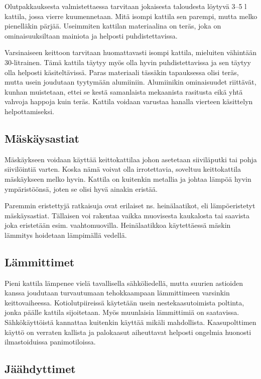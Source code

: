 \documentclass[a4paper,11pt]{report}
\begin{document}
Olutpakkauksesta valmistettaessa tarvitaan jokaisesta taloudesta löytyvä 3--5 l kattila, jossa vierre kuumennetaan. Mitä isompi kattila sen parempi, mutta melko pienelläkin pärjää. Useimmiten kattilan materiaalina on teräs, joka on ominaisuuksiltaan mainiota ja helposti puhdistettavissa.

Varsinaiseen keittoon tarvitaan huomattavasti isompi kattila, mieluiten vähintään 30-litrainen. Tämä kattila täytyy myös olla hyvin puhdistettavissa ja sen täytyy olla helposti käsiteltävissä. Paras materiaali tässäkin tapauksessa olisi teräs, mutta usein joudutaan tyytymään alumiiniin. Alumiinikin ominaisuudet riittävät, kunhan muistetaan, ettei se kestä samanlaista mekaanista rasitusta eikä yhtä vahvoja happoja kuin teräs. Kattila voidaan varustaa hanalla vierteen käsittelyn helpottamiseksi.

\subsection*{Mäskäysastiat}

Mäskäykseen voidaan käyttää keittokattilaa johon asetetaan siiviläputki tai pohja siivilöintiä varten. Koska nämä voivat olla irrotettavia, soveltuu keittokattila mäskäykseen melko hyvin. Kattila on kuitenkin metallia ja johtaa lämpöä hyvin ympäristöönsä, joten se olisi hyvä ainakin eristää.

Paremmin eristettyjä ratkaisuja ovat erilaiset ns. heinälaatikot, eli lämpöeristetyt mäskäysastiat. Tällaisen voi rakentaa vaikka muovisesta kaukalosta tai saavista joka eristetään esim. vaahtomuovilla. Heinälaatikkoa käytettäessä mäskin lämmitys hoidetaan lämpimällä vedellä.

\subsection*{Lämmittimet}
Pieni kattila lämpenee vielä tavallisella sähköliedellä, mutta suurien astioiden kanssa joudutaan turvautumaan tehokkaampaan lämmittimeen varsinkin keittovaiheessa. Kotiolutpiireissä käytetään usein nestekaasutoimista poltinta, jonka päälle kattila sijoitetaan. Myös muunlaisia lämmittimiä on saatavissa. Sähkökäyttöistä kannattaa kuitenkin käyttää mikäli mahdollista. Kaasupolttimen käyttö on verraten kallista ja palokaasut aiheuttavat helposti ongelmia huonosti ilmastoiduissa panimotiloissa.

\subsection*{Jäähdyttimet}
\end{document}
